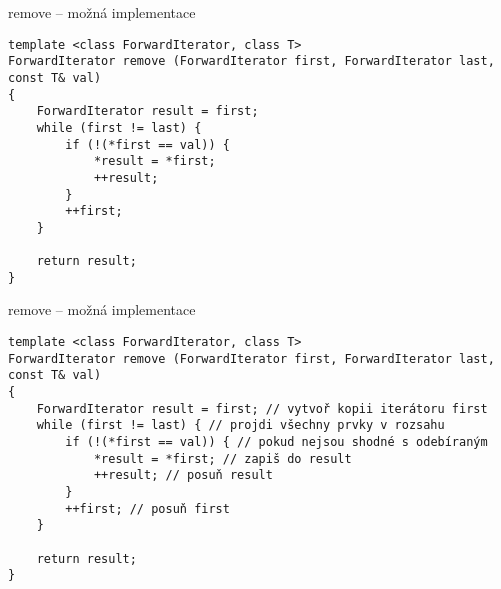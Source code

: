 \begin{frame}[fragile]
\begin{block}{remove -- možná implementace}
\begin{lstlisting}
template <class ForwardIterator, class T>
ForwardIterator remove (ForwardIterator first, ForwardIterator last, const T& val)
{
	ForwardIterator result = first;
	while (first != last) {
		if (!(*first == val)) {
			*result = *first;
			++result;
		}
		++first;
	}
	
	return result;
}\end{lstlisting}
\end{block}
\end{frame}




\begin{frame}[fragile]
\begin{block}{remove -- možná implementace}
\begin{lstlisting}
template <class ForwardIterator, class T>
ForwardIterator remove (ForwardIterator first, ForwardIterator last, const T& val)
{
	ForwardIterator result = first; // vytvoř kopii iterátoru first
	while (first != last) { // projdi všechny prvky v rozsahu
		if (!(*first == val)) { // pokud nejsou shodné s odebíraným
			*result = *first; // zapiš do result
			++result; // posuň result
		}
		++first; // posuň first
	}
	
	return result;
}\end{lstlisting}
\end{block}
\end{frame}

